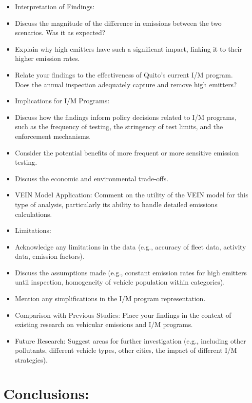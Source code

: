 \documentclass[atmosphere,article,submit,moreauthors,pdftex]{Definitions/mdpi}
\providecommand{\tightlist}{%
  \setlength{\itemsep}{0pt}\setlength{\parskip}{0pt}}
\begin{document}
\begin{itemize}
\tightlist
\item
  Interpretation of Findings:
\item
  Discuss the magnitude of the difference in emissions between the two
  scenarios. Was it as expected?
\item
  Explain why high emitters have such a significant impact, linking it
  to their higher emission rates.
\item
  Relate your findings to the effectiveness of Quito's current I/M
  program. Does the annual inspection adequately capture and remove high
  emitters?
\item
  Implications for I/M Programs:
\item
  Discuss how the findings inform policy decisions related to I/M
  programs, such as the frequency of testing, the stringency of test
  limits, and the enforcement mechanisms.
\item
  Consider the potential benefits of more frequent or more sensitive
  emission testing.
\item
  Discuss the economic and environmental trade-offs.
\item
  VEIN Model Application: Comment on the utility of the VEIN model for
  this type of analysis, particularly its ability to handle detailed
  emissions calculations.
\item
  Limitations:
\item
  Acknowledge any limitations in the data (e.g., accuracy of fleet data,
  activity data, emission factors).
\item
  Discuss the assumptions made (e.g., constant emission rates for high
  emitters until inspection, homogeneity of vehicle population within
  categories).
\item
  Mention any simplifications in the I/M program representation.
\item
  Comparison with Previous Studies: Place your findings in the context
  of existing research on vehicular emissions and I/M programs.
\item
  Future Research: Suggest areas for further investigation (e.g.,
  including other pollutants, different vehicle types, other cities, the
  impact of different I/M strategies).
\end{itemize}

\section{Conclusions:}\label{conclusions}
\end{document}
